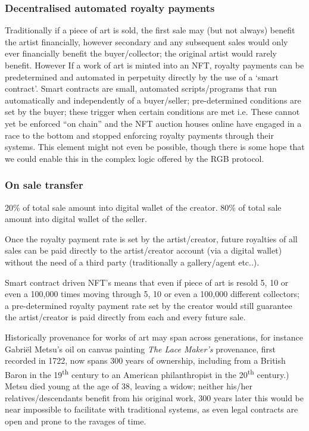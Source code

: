 \subsubsection{Decentralised automated royalty payments} 
Traditionally if a  piece of art is sold, the first sale may (but not always) benefit the
  artist financially, however secondary and any subsequent sales would
  only ever financially benefit the buyer/collector; the original artist
  would rarely benefit. However If a work of art is minted into an NFT,
  royalty payments can be predetermined and automated in perpetuity
  directly by the use of a `smart contract'. Smart contracts are small,
  automated scripts/programs that run automatically and independently of
  a buyer/seller; pre-determined conditions are set by the buyer; these
  trigger when certain conditions are met i.e. These cannot yet be enforced ``on chain'' and the NFT auction houses online have engaged in a race to the bottom and stopped enforcing royalty payments through their systems. This element might not even be possible, though there is some hope that we could enable this in the complex logic offered by the RGB protocol.
\subsubsection{On sale transfer}
20\% of total sale amount into digital wallet of the creator.
80\% of total sale amount into digital wallet of the seller.

Once the royalty payment rate is set by the artist/creator, future
royalties of all sales can be paid directly to the artist/creator
account (via a digital wallet) without the need of a third party
(traditionally a gallery/agent etc..).

Smart contract driven NFT's means that even if piece of art is resold 5,
10 or even a 100,000 times moving through 5, 10 or even a 100,000
different collectors; a pre-determined royalty payment rate set by the
creator would still guarantee the artist/creator is paid directly from
each and every future sale.

Historically provenance for works of art may span across generations,
for instance Gabriël Metsu's oil on canvas painting \emph{The Lace
Maker's} provenance, first recorded in 1722, now spans 300 years of
ownership, including from a British Baron in the 19\textsuperscript{th}
century to an American philanthropist in the 20\textsuperscript{th}
century.) Metsu died young at the age of 38, leaving a widow; neither
his/her relatives/descendants benefit from his original work, 300 years
later this would be near impossible to facilitate with traditional
systems, as even legal contracts are open and prone to the ravages of
time.

